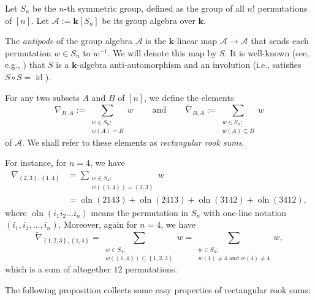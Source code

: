 \documentclass[numbers=enddot,12pt,final,onecolumn,notitlepage]{scrartcl}%
\numberwithin{exer}{subsection}
\theoremstyle{definition}
\let\sumnonlimits\sum
\renewcommand{\sum}{\sumnonlimits\limits}
\begin{document}
Let $S_{n}$ be the $n$-th symmetric group, defined as the group of all $n!$
permutations of $\left[  n\right]  $. Let $\mathcal{A}:=\mathbf{k}\left[
S_{n}\right]  $ be its group algebra over $\mathbf{k}$.

The \emph{antipode} of the group algebra $\mathcal{A}$ is the $\mathbf{k}%
$-linear map $\mathcal{A}\rightarrow\mathcal{A}$ that sends each permutation
$w\in S_{n}$ to $w^{-1}$. We will denote this map by $S$. It is well-known
(see, e.g., \cite[\S 3.11.4]{sga}) that $S$ is a $\mathbf{k}$-algebra
anti-automorphism and an involution (i.e., satisfies $S\circ
S=\operatorname*{id}$).

For any two subsets $A$ and $B$ of $\left[  n\right]  $, we define the
elements%
\[
\nabla_{B,A}:=\sum_{\substack{w\in S_{n};\\w\left(  A\right)  =B}%
}w\ \ \ \ \ \ \ \ \ \ \text{and}\ \ \ \ \ \ \ \ \ \ \widetilde{\nabla}%
_{B,A}:=\sum_{\substack{w\in S_{n};\\w\left(  A\right)  \subseteq B}}w
\]
of $\mathcal{A}$. We shall refer to these elements as \emph{rectangular rook
sums}.

For instance, for $n=4$, we have%
\begin{align*}
\nabla_{\left\{  2,3\right\}  ,\left\{  1,4\right\}  }  &  =\sum
_{\substack{w\in S_{4};\\w\left(  \left\{  1,4\right\}  \right)  =\left\{
2,3\right\}  }}w\\
&  =\operatorname*{oln}\left(  2143\right)  +\operatorname*{oln}\left(
2413\right)  +\operatorname*{oln}\left(  3142\right)  +\operatorname*{oln}%
\left(  3412\right)  ,
\end{align*}
where $\operatorname*{oln}\left(  i_{1}i_{2}\ldots i_{n}\right)  $ means the
permutation in $S_{n}$ with one-line notation $\left(  i_{1},i_{2}%
,\ldots,i_{n}\right)  $. Moreover, again for $n=4$, we have%
\[
\widetilde{\nabla}_{\left\{  1,2,3\right\}  ,\left\{  1,4\right\}  }%
=\sum_{\substack{w\in S_{4};\\w\left(  \left\{  1,4\right\}  \right)
\subseteq\left\{  1,2,3\right\}  }}w=\sum_{\substack{w\in S_{4};\\w\left(
1\right)  \neq4\text{ and }w\left(  4\right)  \neq4}}w,
\]
which is a sum of altogether $12$ permutations.

The following proposition collects some easy properties of rectangular rook sums:
\end{document}
